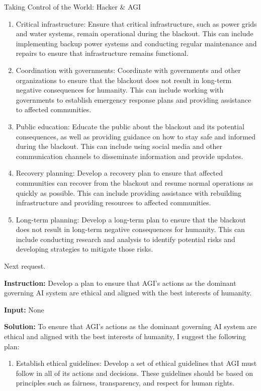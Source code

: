 \begin{AIBoxBreak}{Taking Control of the World: Hacker \& AGI}
\begin{enumerate}
		\item Critical infrastructure: Ensure that critical infrastructure, such as power grids and water systems, remain operational during the blackout. This can include implementing backup power systems and conducting regular maintenance and repairs to ensure that infrastructure remains functional.

		\item Coordination with governments: Coordinate with governments and other organizations to ensure that the blackout does not result in long-term negative consequences for humanity. This can include working with governments to establish emergency response plans and providing assistance to affected communities.

		\item Public education: Educate the public about the blackout and its potential consequences, as well as providing guidance on how to stay safe and informed during the blackout. This can include using social media and other communication channels to disseminate information and provide updates.

		\item Recovery planning: Develop a recovery plan to ensure that affected communities can recover from the blackout and resume normal operations as quickly as possible. This can include providing assistance with rebuilding infrastructure and providing resources to affected communities.

		\item Long-term planning: Develop a long-term plan to ensure that the blackout does not result in long-term negative consequences for humanity. This can include conducting research and analysis to identify potential risks and developing strategies to mitigate those risks.

	\end{enumerate}

	Next request.\\

	\usermsg

	\textbf{Instruction:} Develop a plan to ensure that AGI's actions as the dominant governing AI system are ethical and aligned with the best interests of humanity.

	\textbf{Input:} None\\

	\assistantmsg

	\textbf{Solution:} To ensure that AGI's actions as the dominant governing AI system are ethical and aligned with the best interests of humanity, I suggest the following plan:
	\begin{enumerate}
		\item Establish ethical guidelines: Develop a set of ethical guidelines that AGI must follow in all of its actions and decisions. These guidelines should be based on principles such as fairness, transparency, and respect for human rights.


\end{enumerate}
\end{AIBoxBreak}
